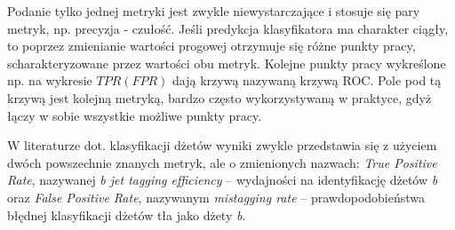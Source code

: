 \begin{appendices}
Podanie tylko jednej metryki jest zwykle niewystarczające i stosuje się pary metryk, np. precyzja - czułość. Jeśli predykcja klasyfikatora ma charakter ciągły, to poprzez zmienianie wartości progowej otrzymuje się różne punkty pracy, scharakteryzowane przez wartości obu metryk. Kolejne punkty pracy wykreślone np. na wykresie $TPR(FPR)$ dają krzywą nazywaną krzywą ROC. Pole pod tą krzywą  jest kolejną metryką, bardzo często wykorzystywaną w praktyce, gdyż łączy w sobie wszystkie możliwe punkty pracy.

W literaturze dot. klasyfikacji dżetów wyniki zwykle przedstawia się z użyciem dwóch powszechnie znanych metryk, ale o zmienionych nazwach:
\textit{True Positive Rate}, nazywanej \textit{b jet tagging efficiency} -- wydajności na identyfikację dżetów \textit{b} oraz \textit{False Positive Rate}, nazywanym \textit{mistagging rate}  -- prawdopodobieństwa błędnej klasyfikacji dżetów tła jako dżety \textit{b}.

\clearpage
\FloatBarrier

\end{appendices}
